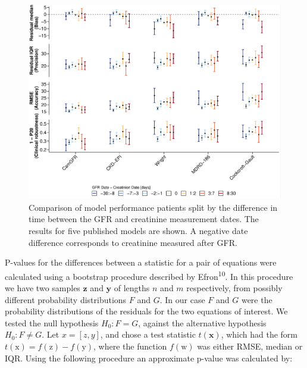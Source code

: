\documentclass[11pt,]{article}
\begin{document}
\begin{figure}
\centering
\includegraphics{1_Validation_nonIDMS_resubmission_files/figure-latex/PLOT_performance_data_diff-1.pdf}
\caption{\label{fig:performace_date_diff}Comparison of model performance
patients split by the difference in time between the GFR and creatinine
measurement dates. The results for five published models are shown. A
negative date difference corresponds to creatinine measured after GFR.}
\end{figure}

P-values for the differences between a statistic for a pair of equations
were calculated using a bootstrap procedure described by
Efron\textsuperscript{10}. In this procedure we have two samples
\(\mathbf{z}\) and \(\mathbf{y}\) of lengths \(n\) and \(m\)
respectively, from possibly different probability distributions \(F\)
and \(G\). In our case \(F\) and \(G\) were the probability
distributions of the residuals for the two equations of interest. We
tested the null hypothesis \(H_0: F = G\), against the alternative
hypothesis \(H_0: F \neq G\). Let \(x = [z,y]\), and chose a test
statistic \(t(\mathbf{x})\), which had the form
\(t(\mathrm{x}) = f(\mathrm{z}) - f(\mathrm{y})\), where the function
\(f(\mathrm{w})\) was either RMSE, median or IQR. Using the following
procedure an approximate p-value was calculated by:
\end{document}
